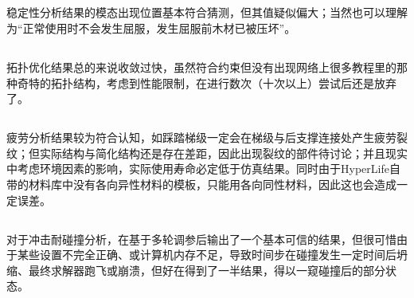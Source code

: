 \documentclass[12pt, oneside, a4paper]{ctexart}
\begin{document}
\subsection{}
\par{}
稳定性分析结果的模态出现位置基本符合猜测，但其值疑似偏大；当然也可以理解为“正常使用时不会发生屈服，发生屈服前木材已被压坏”。
\subsection{}
\par{}
拓扑优化结果总的来说收敛过快，虽然符合约束但没有出现网络上很多教程里的那种奇特的拓扑结构，考虑到性能限制，在进行数次（十次以上）尝试后还是放弃了。
\subsection{}
\par{}
疲劳分析结果较为符合认知，如踩踏梯级一定会在梯级与后支撑连接处产生疲劳裂纹；但实际结构与简化结构还是存在差距，因此出现裂纹的部件待讨论；并且现实中考虑环境因素的影响，实际使用寿命必定低于仿真结果。同时由于HyperLife自带的材料库中没有各向异性材料的模板，只能用各向同性材料，因此这也会造成一定误差。
\subsection{}
\par{}
对于冲击耐碰撞分析，在基于多轮调参后输出了一个基本可信的结果，但很可惜由于某些设置不完全正确、或计算机内存不足，导致时间步在碰撞发生一定时间后坍缩、最终求解器跑飞或崩溃，但好在得到了一半结果，得以一窥碰撞后的部分状态。
\par{}
\quad{}
\par{}
\end{document}
